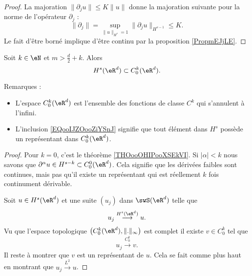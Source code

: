 \begin{proof}
    La majoration \( \| \partial_ju \|\leq K\| u \|\) donne la majoration suivante pour la norme de l'opérateur \( \partial_j\) :
    \begin{equation}
        \| \partial_j \|=\sup_{\| u \|_{H^s}=1}\| \partial_ju \|_{H^{s-1}}\leq K.
    \end{equation}
    Le fait d'être borné implique d'être continu par la proposition \ref{PropmEJjLE}.
\end{proof}

\begin{theorem}
    Soit \( k\in \eN\) et \( m>\frac{ d }{ 2 }+k\). Alors
    \begin{equation}        \label{EQooIJZOooZiYSnJ}
        H^s(\eR^d)\subset C_0^k(\eR^d).
    \end{equation}
\end{theorem}

Remarques :
\begin{itemize}
    \item
        L'espace \( C_0^k(\eR^d)\) est l'ensemble des fonctions de classe \( C^k\) qui s'annulent à l'infini.
    \item 
        L'inclusion \eqref{EQooIJZOooZiYSnJ} signifie que tout élément dans \( H^s\) possède un représentant dans \( C_0^k(\eR^d)\).
\end{itemize}

\begin{proof}
    Pour \( k=0\), c'est le théorème \ref{THOooOHIPooXSEkVI}. Si \( | \alpha |<k\) nous savons que \( \partial^{\alpha}u\in H^{s-k}\subset C_0^0(\eR^d) \). Cela signifie que les dérivées faibles sont continues, mais pas qu'il existe un représentant qui est réellement \( k\) fois continument dérivable.

    Soit \( u\in H^s(\eR^d)\) et une suite \( (u_j)  \) dans \( \swS(\eR^d)\) telle que
    \begin{equation}
        u_j\stackrel{H^s(\eR^d)}{\longrightarrow}u.
    \end{equation}
    Vu que l'espace topologique \( \big( C_0^k(\eR^d),\| . \|_{\infty} \big)\) est complet il existe \( v\in C_0^k\) tel que
    \begin{equation}
        u_j\stackrel{C_0^k}{\longrightarrow}v.
    \end{equation}
    Il reste à montrer que \( v\) est un représentant de \( u\). Cela se fait comme plus haut en montrant que \( u_j\stackrel{L^2}{\longrightarrow}u\).
\end{proof}
